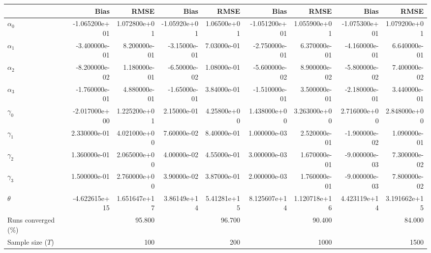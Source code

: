 
\begin{tabular}[t]{lrrrrrrrr}
\toprule
  & Bias & RMSE & Bias & RMSE & Bias & RMSE & Bias & RMSE\\
\midrule
$\alpha_{0}$ & -1.065200e+01 & 1.072800e+01 & -1.05920e+01 & 1.06500e+01 & -1.051200e+01 & 1.055900e+01 & -1.075300e+01 & 1.079200e+01\\
$\alpha_{1}$ & -3.400000e-01 & 8.200000e-01 & -3.15000e-01 & 7.03000e-01 & -2.750000e-01 & 6.370000e-01 & -4.160000e-01 & 6.640000e-01\\
$\alpha_{2}$ & -8.200000e-02 & 1.180000e-01 & -6.50000e-02 & 1.08000e-01 & -5.600000e-02 & 8.900000e-02 & -5.800000e-02 & 7.400000e-02\\
$\alpha_{3}$ & -1.760000e-01 & 4.880000e-01 & -1.65000e-01 & 3.84000e-01 & -1.510000e-01 & 3.500000e-01 & -2.180000e-01 & 3.440000e-01\\
$\gamma_{0}$ & -2.017000e+00 & 1.225200e+01 & 2.15000e-01 & 4.25800e+00 & 1.438000e+00 & 3.263000e+00 & 2.716000e+00 & 2.848000e+00\\
$\gamma_{1}$ & 2.330000e-01 & 4.021000e+00 & 7.60000e-02 & 8.40000e-01 & 1.000000e-03 & 2.520000e-01 & -1.900000e-02 & 1.090000e-01\\
$\gamma_{2}$ & 1.360000e-01 & 2.065000e+00 & 4.00000e-02 & 4.55000e-01 & 3.000000e-03 & 1.670000e-01 & -9.000000e-03 & 7.300000e-02\\
$\gamma_{3}$ & 1.500000e-01 & 2.760000e+00 & 3.90000e-02 & 3.87000e-01 & 2.000000e-03 & 1.760000e-01 & -9.000000e-03 & 7.800000e-02\\
$\theta$ & -4.622615e+15 & 1.651647e+17 & 3.86149e+14 & 5.41281e+15 & 8.125607e+14 & 1.120718e+16 & 4.423119e+14 & 3.191662e+15\\
Runs converged (\%) &  & 95.800 &  & 96.700 &  & 90.400 &  & 84.000\\
Sample size ($T$) &  & 100 &  & 200 &  & 1000 &  & 1500\\
\bottomrule
\end{tabular}
